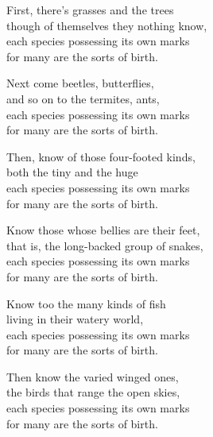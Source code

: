 \begin{MyDescription}{}
First, there's grasses and the trees\\
though of themselves they nothing know,\\
each species possessing its own marks\\
for many are the sorts of birth.
\end{MyDescription}

\begin{MyDescription}{}
Next come beetles, butterflies,\\
and so on to the termites, ants,\\
each species possessing its own marks\\
for many are the sorts of birth.
\end{MyDescription}

\begin{MyDescription}{}
Then, know of those four-footed kinds,\\
both the tiny and the huge\\
each species possessing its own marks\\
for many are the sorts of birth.
\end{MyDescription}

\begin{MyDescription}{}
Know those whose bellies are their feet,\\
that is, the long-backed group of snakes,\\
each species possessing its own marks\\
for many are the sorts of birth.
\end{MyDescription}

\begin{MyDescription}{}
Know too the many kinds of fish\\
living in their watery world,\\
each species possessing its own marks\\
for many are the sorts of birth.
\end{MyDescription}

\begin{MyDescription}{}
Then know the varied winged ones,\\
the birds that range the open skies,\\
each species possessing its own marks\\
for many are the sorts of birth.
\end{MyDescription}

